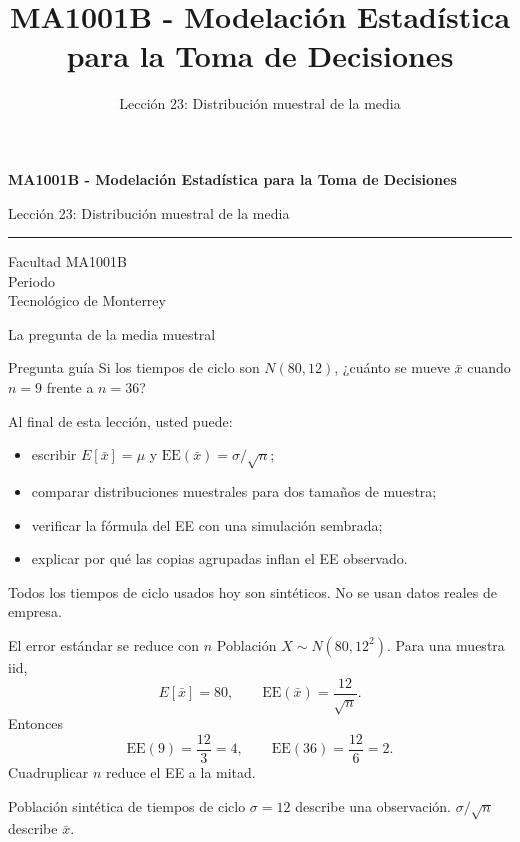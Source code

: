 \documentclass[aspectratio=169,10pt,spanish]{beamer}
\title{MA1001B - Modelación Estadística para la Toma de Decisiones}
\subtitle{Lección 23: Distribución muestral de la media}
\author{}
\institute{Tecnol\'ogico de Monterrey}
\date{}
\begin{document}
\begin{frame}[plain]
  \vspace{1.2cm}
  {\Large\bfseries MA1001B - Modelación Estadística para la Toma de Decisiones\par}
  \vspace{0.7cm}
  {\large Lección 23: Distribución muestral de la media\par}
  \vspace{0.7cm}
  {\color{TecRojo}\rule{\textwidth}{1.2pt}}
  \vspace{0.8cm}

  Facultad MA1001B\\[0.3cm]
  Periodo\\[0.3cm]
  Tecnol\'ogico de Monterrey
\end{frame}

\begin{frame}{La pregunta de la media muestral}
  \begin{alertblock}{Pregunta guía}
    Si los tiempos de ciclo son $N(80,12)$, ¿cuánto se mueve $\bar x$ cuando
    $n=9$ frente a $n=36$?
  \end{alertblock}

  \vspace{0.6em}
  Al final de esta lección, usted puede:
  \begin{itemize}
    \item escribir $E[\bar x]=\mu$ y $\mathrm{EE}(\bar x)=\sigma/\sqrt{n}$;
    \item comparar distribuciones muestrales para dos tamaños de muestra;
    \item verificar la fórmula del EE con una simulación sembrada;
    \item explicar por qué las copias agrupadas inflan el EE observado.
  \end{itemize}

  \vfill
  \scriptsize Todos los tiempos de ciclo usados hoy son sintéticos. No se usan datos reales de empresa.
\end{frame}

\begin{frame}{El error estándar se reduce con $n$}
  \small
  Población $X\sim N(80,12^2)$. Para una muestra iid,
  \[
    E[\bar x]=80,\qquad
    \mathrm{EE}(\bar x)=\frac{12}{\sqrt{n}}.
  \]
  Entonces
  \[
    \mathrm{EE}(9)=\frac{12}{3}=4,\qquad
    \mathrm{EE}(36)=\frac{12}{6}=2.
  \]
  Cuadruplicar $n$ reduce el EE a la mitad.

  \vspace{0.3em}
  \begin{exampleblock}{Población sintética de tiempos de ciclo}
    $\sigma=12$ describe una observación. $\sigma/\sqrt{n}$ describe $\bar x$.
  \end{exampleblock}
\end{frame}
\end{document}
